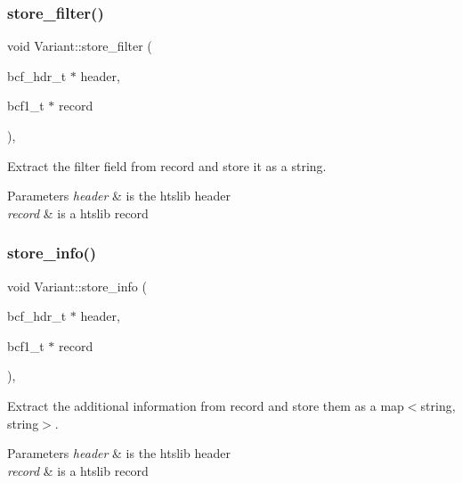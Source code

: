 \subsubsection{\texorpdfstring{store\_filter()}{store\_filter()}}
{\footnotesize\ttfamily void Variant\+::store\+\_\+filter (\begin{DoxyParamCaption}\item[{bcf\+\_\+hdr\+\_\+t $\ast$}]{header,  }\item[{bcf1\+\_\+t $\ast$}]{record }\end{DoxyParamCaption})\hspace{0.3cm}{\ttfamily [inline]}, {\ttfamily [private]}}

Extract the filter field from record and store it as a string.


\begin{DoxyParams}{Parameters}
{\em header} & is the htslib header \\
\hline
{\em record} & is a htslib record \\
\hline
\end{DoxyParams}
\mbox{\label{classVariant_a8d76e6358f4199b494d2ca32e30c05b8}} 
\subsubsection{\texorpdfstring{store\_info()}{store\_info()}}
{\footnotesize\ttfamily void Variant\+::store\+\_\+info (\begin{DoxyParamCaption}\item[{bcf\+\_\+hdr\+\_\+t $\ast$}]{header,  }\item[{bcf1\+\_\+t $\ast$}]{record }\end{DoxyParamCaption})\hspace{0.3cm}{\ttfamily [inline]}, {\ttfamily [private]}}

Extract the additional information from record and store them as a map$<$string, string$>$.


\begin{DoxyParams}{Parameters}
{\em header} & is the htslib header \\
\hline
{\em record} & is a htslib record \\
\hline
\end{DoxyParams}
\mbox{\label{classVariant_a2fbc7e5f6debf1f9cf00ad986062e5b6}} 
